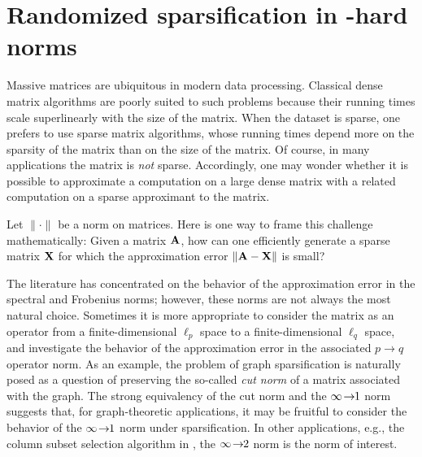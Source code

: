
\chapter{Randomized sparsification in -hard norms}
\label{ch2}


Massive matrices are ubiquitous in modern data processing. Classical dense
matrix algorithms are poorly suited to such problems because their running times
scale superlinearly with the size of the matrix. When the dataset is sparse, one
prefers to use sparse matrix algorithms, whose running times depend more on the
sparsity of the matrix than on the size of the matrix. Of course, in many
applications the matrix is \emph{not} sparse. Accordingly, one may wonder
whether it is possible to approximate a computation on a large dense matrix with
a related computation on a sparse approximant to the matrix.

Let $\|\cdot\|$ be a norm on matrices. Here is one way to frame this challenge 
mathematically: Given a matrix $\mathbf{A}$, how can one efficiently generate a sparse matrix
$\mathbf{X}$ for which the approximation error $\|\mathbf{A} - \mathbf{X}\|$ is small? 

The literature has concentrated on the behavior of the approximation error in
the spectral and Frobenius norms; however, these norms are not always the most
natural choice. Sometimes it is more appropriate to consider the matrix as an operator
from a finite-dimensional $\ell_p$ space to a finite-dimensional $\ell_q$
space, and investigate the behavior of the approximation error in the associated
$p \rightarrow q$ operator norm. As an example, the problem of graph sparsification is naturally
posed as a question of preserving the so-called \emph{cut norm} of a matrix associated 
with the graph. The strong equivalency of the cut norm and the $\infty\!\rightarrow\!\!1$ norm suggests that, for
graph-theoretic applications, it may be fruitful to consider the behavior of the
$\infty\!\rightarrow\!\!1$ norm under sparsification. In other applications, e.g., the column
subset selection algorithm in \cite{Tropp09}, the $\infty\!\rightarrow\!\!2$ norm is the norm of
interest.

